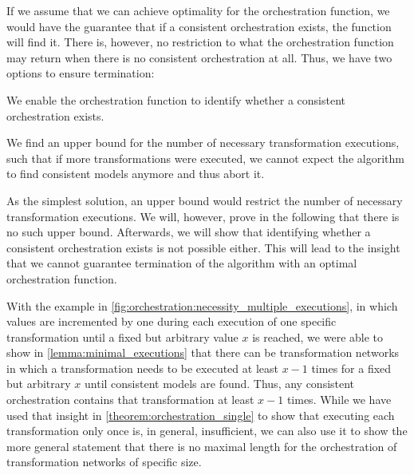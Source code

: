 If we assume that we can achieve optimality for the orchestration function, we would have the guarantee that if a consistent orchestration exists, the function will find it.
There is, however, no restriction to what the orchestration function may return when there is no consistent orchestration at all.
Thus, we have two options to ensure termination:
\begin{longenumerate}
    \item We enable the orchestration function to identify whether a consistent orchestration exists.
    \item We find an upper bound for the number of necessary transformation executions, such that if more transformations were executed, we cannot expect the algorithm to find consistent models anymore and thus abort it.
\end{longenumerate}

As the simplest solution, an upper bound would restrict the number of necessary transformation executions.
We will, however, prove in the following that there is no such upper bound.
Afterwards, we will show that identifying whether a consistent orchestration exists is not possible either.
This will lead to the insight that we cannot guarantee termination of the algorithm with an optimal orchestration function.



With the example in \autoref{fig:orchestration:necessity_multiple_executions}, in which values are incremented by one during each execution of one specific transformation until a fixed but arbitrary value $x$ is reached, we were able to show in \autoref{lemma:minimal_executions} that there can be transformation networks in which a transformation needs to be executed at least $x-1$ times for a fixed but arbitrary $x$ until consistent models are found.
Thus, any consistent orchestration contains that transformation at least $x-1$ times.
While we have used that insight in \autoref{theorem:orchestration_single} to show that executing each transformation only once is, in general, insufficient, we can also use it to show the more general statement that there is no maximal length for the orchestration of transformation networks of specific size.

